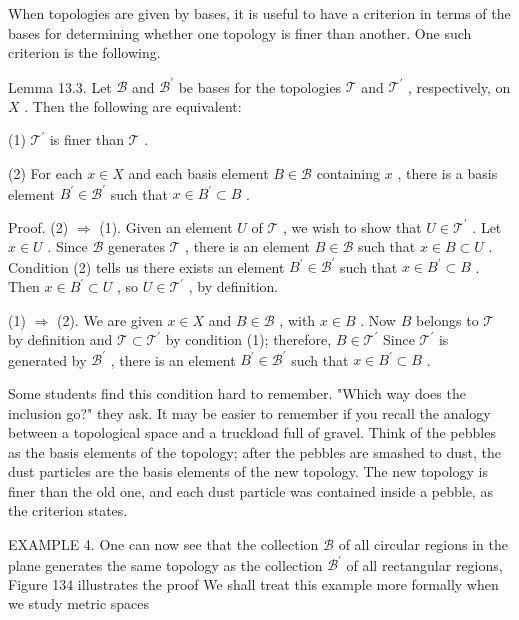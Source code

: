 When topologies are given by bases, it is useful to have a criterion in terms of the bases for determining whether one topology is finer than another. One such criterion is the following.

Lemma 13.3. Let \(\mathcal{B}\) and \({\mathcal{B}}^{\prime }\) be bases for the topologies \(\mathcal{T}\) and \({\mathcal{T}}^{\prime }\) , respectively, on \(X\) . Then the following are equivalent:

(1) \({\mathcal{T}}^{\prime }\) is finer than \(\mathcal{T}\) .

(2) For each \(x \in  X\) and each basis element \(B \in  \mathcal{B}\) containing \(x\) , there is a basis element \({B}^{\prime } \in  {\mathcal{B}}^{\prime }\) such that \(x \in  {B}^{\prime } \subset  B\) .

Proof. (2) \(\Rightarrow\) (1). Given an element \(U\) of \(\mathcal{T}\) , we wish to show that \(U \in  {\mathcal{T}}^{\prime }\) . Let \(x \in  U\) . Since \(\mathcal{B}\) generates \(\mathcal{T}\) , there is an element \(B \in  \mathcal{B}\) such that \(x \in  B \subset  U\) . Condition (2) tells us there exists an element \({B}^{\prime } \in  {\mathcal{B}}^{\prime }\) such that \(x \in  {B}^{\prime } \subset  B\) . Then \(x \in  {B}^{\prime } \subset  U\) , so \(U \in  {\mathcal{T}}^{\prime }\) , by definition.

(1) \(\Rightarrow\) (2). We are given \(x \in  X\) and \(B \in  \mathcal{B}\) , with \(x \in  B\) . Now \(B\) belongs to \(\mathcal{T}\) by definition and \(\mathcal{T} \subset  {\mathcal{T}}^{\prime }\) by condition (1); therefore, \(B \in  {\mathcal{T}}^{\prime }\) Since \({\mathcal{T}}^{\prime }\) is generated by \({\mathcal{B}}^{\prime }\) , there is an element \({B}^{\prime } \in  {\mathcal{B}}^{\prime }\) such that \(x \in  {B}^{\prime } \subset  B\) .

Some students find this condition hard to remember. "Which way does the inclusion go?" they ask. It may be easier to remember if you recall the analogy between a topological space and a truckload full of gravel. Think of the pebbles as the basis elements of the topology; after the pebbles are smashed to dust, the dust particles are the basis elements of the new topology. The new topology is finer than the old one, and each dust particle was contained inside a pebble, as the criterion states.

EXAMPLE 4. One can now see that the collection \(\mathcal{B}\) of all circular regions in the plane generates the same topology as the collection \({\mathcal{B}}^{\prime }\) of all rectangular regions, Figure 134 illustrates the proof We shall treat this example more formally when we study metric spaces

